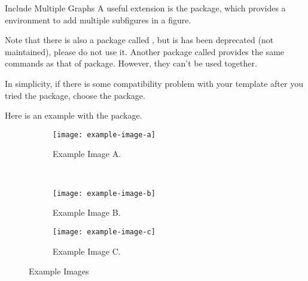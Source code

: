 \begin{frame}[fragile]{Include Multiple Graphs}
    A useful extension is the  package, which provides a  environment to add multiple subfigures in a figure. \medskip
    
    Note that there is also a package called 	, but is has been deprecated (not maintained), please do not use it. Another package called  provides the same commands as that of  package. However, they can't be used together. \medskip
    
    In simplicity, if there is some compatibility problem with your template after you tried the  package, choose the  package. \medskip
    
    Here is an example with the  package.
\end{frame}

\begin{latexexampleframe}
\begin{figure}
    \centering
    \begin{subfigure}{0.3\textwidth}
        \texttt{[image: example-image-a]}
        \caption{Example Image A.}
        \label{fig:subcaption-a}
    \end{subfigure}
    ~ 
    \begin{subfigure}{0.3\textwidth}
        \texttt{[image: example-image-b]}
        \caption{Example Image B.}
        \label{fig:subcaption-b}
    \end{subfigure}
    
    \begin{subfigure}{0.3\textwidth}
        \texttt{[image: example-image-c]}
        \caption{Example Image C.}
        \label{fig:subcaption-c}
    \end{subfigure}
    \caption{Example Images}\label{fig:subcaption}
\end{figure}
\end{latexexampleframe}

